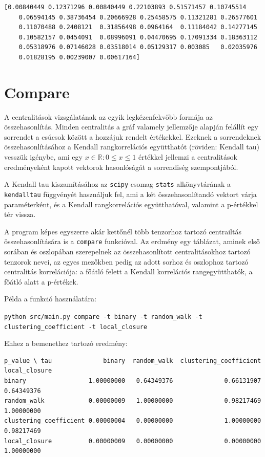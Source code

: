 \documentclass[12pt,numbers=noenddot]{report}
\begin{document}
\footnotesize
\noindent
\begin{verbatim}
[0.00840449 0.12371296 0.00840449 0.22103893 0.51571457 0.10745514
	0.06594145 0.38736454 0.20666928 0.25458575 0.11321281 0.26577601
	0.11070488 0.2408121  0.31856498 0.0964164  0.11184042 0.14277145
	0.10582157 0.0454091  0.08996091 0.04470695 0.17091334 0.18363112
	0.05318976 0.07146028 0.03518014 0.05129317 0.003085   0.02035976
	0.01828195 0.00239007 0.00617164]
\end{verbatim}
\normalfont

\section{Compare}

A centralitások vizsgálatának az egyik legkézenfekvőbb formája az 
összehasonlítás. Minden centralitás a gráf valamely jellemzője alapján
felállít egy sorrendet a csúcsok között a hozzájuk rendelt értékekkel.
Ezeknek a sorrendeknek összehasonlításához a Kendall rangkorrelációs 
együtthatót (röviden: Kendall tau) vesszük igénybe, ami egy 
$x \in \mathbb{R}: 0 \leq x \leq 1$
értékkel jellemzi a centralitások eredményeként kapott vektorok hasonlóságát
a sorrendiség szempontjából.

A Kendall tau kiszamításához az \texttt{scipy} csomag \texttt{stats} 
alkönyvtárának a \texttt{kendalltau} függvényét használjuk fel, ami a két 
összehasonlítandó vektort várja paraméterként, és a Kendall rangkorrelációs 
együtthatóval, valamint a p-értékkel tér vissza.

A program képes egyszerre akár kettőnél több tenzorhoz tartozó centrailtás 
összehasonlítására is a \texttt{compare} funkcióval. Az erdmény egy táblázat, aminek első sorában és 
oszlopában szerepelnek az összehasonlított centralitásokhoz tartozó tenzorok 
nevei, az egyes mezőkben pedig az adott sorhoz és oszlophoz tartozó centralitás
korrelációja: a főátló felett a Kendall korrelációs rangegyütthatók, a főátló
alatt a p-értékek.

\noindent
Példa a funkció használatára:

\texttt{python src/main.py compare -t binary -t random\_walk -t clustering\_coefficient -t local\_closure}

\pagebreak

\noindent
Ehhez a bemenethez tartozó eredmény:

\scriptsize
\begin{verbatim}
p_value \ tau              binary  random_walk  clustering_coefficient  local_closure
binary                 1.00000000   0.64349376              0.66131907     0.64349376
random_walk            0.00000009   1.00000000              0.98217469     1.00000000
clustering_coefficient 0.00000004   0.00000000              1.00000000     0.98217469
local_closure          0.00000009   0.00000000              0.00000000     1.00000000
\end{verbatim}
\normalsize
\end{document}

